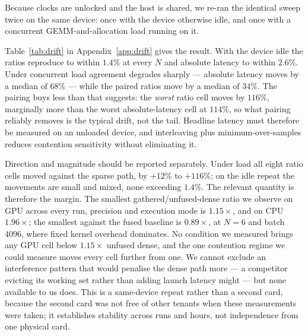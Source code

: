 Because clocks are unlocked and the host is shared, we re-ran the identical
sweep twice on the same device: once with the device otherwise idle, and once
with a concurrent GEMM-and-allocation load running on it.

Table~\ref{tab:drift} in Appendix~\ref{app:drift} gives the result. With the
device idle the ratios reproduce to within $1.4\%$ at every $N$ and absolute
latency to within $2.6\%$. Under concurrent load agreement degrades sharply ---
absolute latency moves by a median of $68\%$ --- while the paired ratios move by
a median of $34\%$. The pairing buys less than that suggests: the \emph{worst}
ratio cell moves by $116\%$, marginally more than the worst absolute-latency
cell at $114\%$, so what pairing reliably removes is the typical drift, not the
tail. Headline latency must therefore be measured on an unloaded device, and
interleaving plus minimum-over-samples reduces contention sensitivity without
eliminating it.

Direction and magnitude should be reported separately. Under load all eight
ratio cells moved against the sparse path, by $+12\%$ to $+116\%$; on the idle
repeat the movements are small and mixed, none exceeding $1.4\%$. The relevant
quantity is therefore the margin. The smallest gathered/unfused-dense ratio we
observe on GPU across every run, precision and execution mode is $1.15\times$,
and on CPU $1.96\times$; the smallest against the fused baseline is
$0.89\times$, at $N{=}6$ and batch $4096$, where fixed kernel overhead
dominates. No condition we measured brings any GPU cell below $1.15\times$
unfused dense, and the one contention regime we could measure moves every cell
further from one. We cannot exclude an interference pattern that would penalise
the dense path more --- a competitor evicting its working set rather than adding
launch latency might --- but none available to us does. This is a same-device
repeat rather than a second card, because the second card was not free of other
tenants when these measurements were taken; it establishes stability across
runs and hours, not independence from one physical card.
